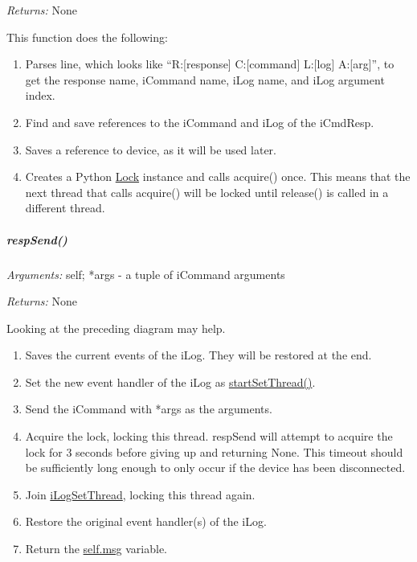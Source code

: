 \documentclass[12pt,letterpaper]{article}
\begin{document}
\emph{Returns:} None

This function does the following:

\begin{enumerate}

\item Parses line, which looks like ``R:[response] C:[command] L:[log] A:[arg]'', to get the response name, iCommand name, iLog name, and iLog argument index.

\item Find and save references to the iCommand and iLog of the iCmdResp.

\item Saves a reference to device, as it will be used later.

\item Creates a Python \href{http://docs.python.org/library/threading.html#lock-objects}{Lock} instance and calls acquire() once. This means that the next thread that calls acquire() will be locked until release() is called in a different thread.

\end{enumerate}



%
%
\subparagraph{respSend()}
\label{4.7.1.0.1}

\emph{Arguments:} self; *args - a tuple of iCommand arguments

\emph{Returns:} None

Looking at the preceding diagram may help.

\begin{enumerate}

\item Saves the current events of the iLog. They will be restored at the end.

\item Set the new event handler of the iLog as \hyperref[4.7.1.0.2]{startSetThread()}.

\item Send the iCommand with *args as the arguments.

\item Acquire the lock, locking this thread.  respSend will attempt to acquire the lock for 3 seconds before giving up and returning None. This timeout should be sufficiently long enough to only occur if the device has been disconnected.

\item Join \hyperref[4.7.2.4.7]{iLogSetThread}, locking this thread again.

\item Restore the original event handler(s) of the iLog.

\item Return the \hyperref[4.7.2.4.8]{self.msg} variable.

\end{enumerate}
\end{document}
